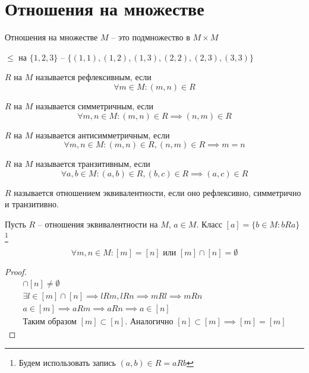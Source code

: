 \documentclass[main]{subfiles}
\begin{document}
\chapter{Отношения на множестве}
\begin{definition}
    Отношения на множестве $M$ -- это подмножество в $M\times M$
\end{definition}
\begin{example}
    $\le$ на $\{1,2,3\}$  -- $\{(1,1), (1,2), (1,3), (2,2),(2,3),(3,3)\}$
\end{example}

\begin{definition}
    $R$ на $M$ называется рефлексивным, если \[\forall m \in M: (m,n) \in R\]
\end{definition}
\begin{definition}
    $R$ на $M$ называется симметричным, если
    \[\forall m,n \in M: (m,n) \in R \implies (n,m) \in R\]
\end{definition}
\begin{definition}
    $R$ на $M$ называется антисимметричным, если
    \[\forall m,n \in M:  (m,n)\in R, (n,m) \in R \implies m = n\]
\end{definition}
\begin{definition}
    $R$ на $M$ называется транзитивным, если
    \[\forall a,b \in M: (a,b) \in R, (b,c) \in R \implies (a,c) \in R\]
\end{definition}

\begin{definition}
    $R$ называется отношением эквивалентности, если оно рефлексивно,
    симметрично и транзитивно.
\end{definition}

\begin{definition}
    Пусть $R$ -- отношения эквивалентности на $M$, $a \in M$.
    Класс $[a] = \{b\in M: bRa\}$%
    \footnote{Будем использовать запись $(a,b)\in R = aRb$}
\end{definition}

\begin{lemma}
    \[\forall m,n \in M: [m] = [n] \text{ или } [m]\cap[n] = \emptyset\]
\end{lemma}
\begin{proof}
    \begin{gather*}
        [m] \cap [n] \neq \emptyset\\
        \exists l \in [m] \cap [n] \implies lRm, lRn \implies mRl \implies mRn\\
        a\in [m] \implies aRm \implies aRn \implies a \in [n]\\
        \text{Таким образом } [m]\subset [n]. \text{ Аналогично } [n]\subset[m]
        \implies [m]=[m]
    \end{gather*}
\end{proof}
\end{document}
